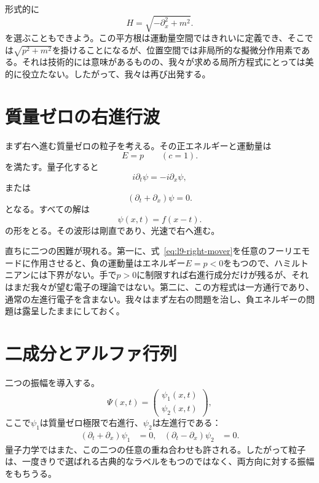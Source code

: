形式的に
\begin{equation}
H=\sqrt{-\partial_x^2+m^2}.
\end{equation}
を選ぶこともできよう。この平方根は運動量空間ではきれいに定義でき、そこでは\(\sqrt{p^2+m^2}\)を掛けることになるが、位置空間では非局所的な擬微分作用素である。それは技術的には意味があるものの、我々が求める局所方程式にとっては美的に役立たない。したがって、我々は再び出発する。

\section{質量ゼロの右進行波}

まず右へ進む質量ゼロの粒子を考える。その正エネルギーと運動量は
\begin{equation}
E=p
\qquad (c=1).
\end{equation}
を満たす。量子化すると
\begin{equation}
i\partial_t\psi=-i\partial_x\psi,
\end{equation}
または
\begin{equation}
(\partial_t+\partial_x)\psi=0.
\label{eq:l9-right-mover}
\end{equation}
となる。すべての解は
\begin{equation}
\psi(x,t)=f(x-t).
\end{equation}
の形をとる。その波形は剛直であり、光速で右へ進む。

直ちに二つの困難が現れる。第一に、式~\eqref{eq:l9-right-mover}を任意のフーリエモードに作用させると、負の運動量はエネルギー\(E=p<0\)をもつので、ハミルトニアンには下界がない。手で\(p>0\)に制限すれば右進行成分だけが残るが、それはまだ我々が望む電子の理論ではない。第二に、この方程式は一方通行であり、通常の左進行電子を含まない。我々はまず左右の問題を治し、負エネルギーの問題は露呈したままにしておく。

\section{二成分とアルファ行列}

二つの振幅を導入する。
\begin{equation}
\Psi(x,t)=
\begin{pmatrix}
\psi_1(x,t)\\[3pt]
\psi_2(x,t)
\end{pmatrix},
\end{equation}
ここで\(\psi_1\)は質量ゼロ極限で右進行、\(\psi_2\)は左進行である：
\begin{align}
(\partial_t+\partial_x)\psi_1&=0,
&
(\partial_t-\partial_x)\psi_2&=0.
\end{align}
量子力学ではまた、この二つの任意の重ね合わせも許される。したがって粒子は、一度きりで選ばれる古典的なラベルをもつのではなく、両方向に対する振幅をもちうる。

